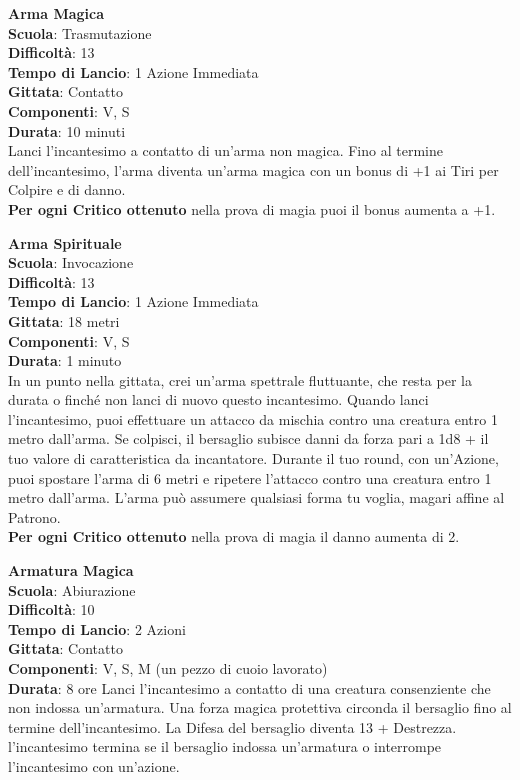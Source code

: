 \begin{multicols}{2}
\medskip\textbf{Arma Magica}\\
\textbf{Scuola}: Trasmutazione\\
\textbf{Difficoltà}:  13\\
\textbf{Tempo di Lancio}: 1 Azione Immediata\\
\textbf{Gittata}: Contatto\\
\textbf{Componenti}: V, S\\
\textbf{Durata}: 10 minuti\\
Lanci l'incantesimo a contatto di un'arma non magica. Fino al termine dell'incantesimo, l’arma diventa un'arma magica con un bonus di +1 ai Tiri per Colpire e di danno.\\
\textbf{Per ogni Critico ottenuto} nella prova di magia puoi il bonus aumenta a +1.

\medskip\textbf{Arma Spirituale}\\
\textbf{Scuola}: Invocazione\\
\textbf{Difficoltà}:  13\\
\textbf{Tempo di Lancio}: 1 Azione Immediata\\
\textbf{Gittata}: 18 metri\\
\textbf{Componenti}: V, S\\
\textbf{Durata}: 1 minuto\\
In un punto nella gittata, crei un'arma spettrale fluttuante, che resta per la durata o finché non lanci di nuovo questo incantesimo. Quando lanci l'incantesimo, puoi effettuare un attacco da mischia contro una creatura entro 1 metro dall'arma. Se colpisci, il bersaglio subisce danni da forza pari a 1d8 + il tuo valore di caratteristica da incantatore. Durante il tuo round, con un'Azione, puoi spostare l’arma di 6 metri e ripetere l’attacco contro una creatura entro 1 metro dall'arma. L’arma può assumere qualsiasi forma tu voglia, magari affine al Patrono.\\
\textbf{Per ogni Critico ottenuto} nella prova di magia il danno aumenta di 2.

\medskip\textbf{Armatura Magica}\\
\textbf{Scuola}: Abiurazione\\
\textbf{Difficoltà}:  10\\
\textbf{Tempo di Lancio}: 2 Azioni\\
\textbf{Gittata}: Contatto\\
\textbf{Componenti}: V, S, M (un pezzo di cuoio lavorato)\\
\textbf{Durata}: 8 ore
Lanci l'incantesimo a contatto di una creatura consenziente che non indossa un'armatura. Una forza magica protettiva circonda il bersaglio fino al termine dell'incantesimo. La Difesa del bersaglio diventa 13 + Destrezza. l'incantesimo termina se il bersaglio indossa un'armatura o interrompe l'incantesimo con un'azione.



\end{multicols}
